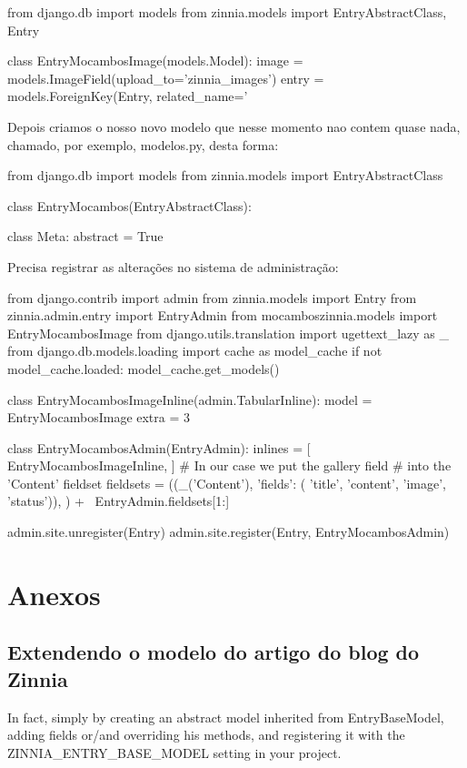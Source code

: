 \begin{code}
from django.db import models
from zinnia.models import EntryAbstractClass, Entry

class EntryMocambosImage(models.Model):
    image = models.ImageField(upload_to='zinnia_images')
    entry = models.ForeignKey(Entry, related_name='%
\end{code}

Depois criamos o nosso novo modelo que nesse momento nao contem quase
nada, chamado, por exemplo, modelos.py, desta forma:

\begin{code}
from django.db import models
from zinnia.models import EntryAbstractClass

class EntryMocambos(EntryAbstractClass):

    class Meta:
    abstract = True
\end{code}

Precisa registrar as alterações no sistema de administração:

\begin{code}
from django.contrib import admin
from zinnia.models import Entry
from zinnia.admin.entry import EntryAdmin
from mocamboszinnia.models import EntryMocambosImage
from django.utils.translation import ugettext_lazy as _
from django.db.models.loading import cache as model_cache
if not model_cache.loaded:
    model_cache.get_models()


class EntryMocambosImageInline(admin.TabularInline):
    model = EntryMocambosImage
    extra = 3

class EntryMocambosAdmin(EntryAdmin):
    inlines = [ EntryMocambosImageInline, ]
    # In our case we put the gallery field                                                                                                                     
    # into the 'Content' fieldset                                                                                                                              
    fieldsets = ((_('Content'), {'fields': (
                    'title', 'content', 'image', 'status')}), ) + \
                    EntryAdmin.fieldsets[1:]


admin.site.unregister(Entry)
admin.site.register(Entry, EntryMocambosAdmin)
\end{code}


\chapter{Anexos}
\section{Extendendo o modelo do artigo do blog do Zinnia}\label{ExtZinniaEntry}
In fact, simply by creating an abstract model inherited from
EntryBaseModel, adding fields or/and overriding his methods, and
registering it with the ZINNIA_ENTRY_BASE_MODEL setting in your
project.

